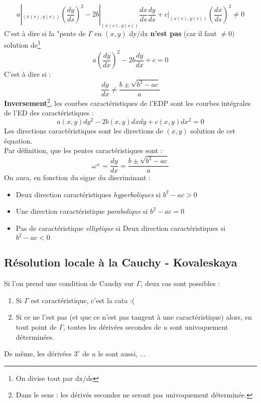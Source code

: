 \documentclass[british,french,11pt, a4paper, openany]{book}
\begin{document}
			\begin{equation}
				a|_{(x(s),y(s))} \left(\dfrac{dy}{ds}\right)^2 - 2b|_{(x(s),y(s))} \dfrac{dx}{ds}\dfrac{dy}{ds} + c|_{(x(s),y(s))}\left(\dfrac{dx}{ds}\right)^2 \neq 0
			\end{equation}
			C'est à dire si la "pente de $\Gamma$ en $(x,y)$ dy/dx \textbf{n'est pas} (car il faut $\neq 0)$ solution de\footnote{On divise tout par dx/ds}
			\begin{equation}
				a\left(\dfrac{dy}{dx}\right)^2 - 2b\dfrac{dy}{dx} + c = 0
			\end{equation}
			C'est à dire si :
			\begin{equation}
				\dfrac{dy}{dx} \neq \dfrac{b\pm \sqrt{b^2-ac}}{a}
			\end{equation}
			\textbf{Inversement}\footnote{Dans le sens : les dérivés secondes ne seront pas univoquement déterminée.}, les courbes caractéristiques de l'EDP sont les courbes intégrales de l'ED des caractéristiques :
			\begin{equation}
				a(x,y)dy^2 - 2b(x,y)dxdy + c(x,y)dx^2 = 0
			\end{equation}
			Les directions caractéristiques sont les directions de $(x,y)$ solution de cet équation.\\Par définition, que les pentes caractéristiques sont :
			\begin{equation}
				\omega^\pm = \dfrac{dy}{dx} = \dfrac{b\pm \sqrt{b^2-ac}}{a}
			\end{equation}
			On aura, en fonction du signe du discriminant :
			\begin{itemize}
				\item Deux direction caractéristiques \textit{hyperboliques} si $b^2-ac > 0$
				\item Une direction caractéristique \textit{parabolique} si $b^2-ac = 0$
				\item Pas de caractéristique \textit{elliptique} si Deux direction caractéristiques si $b^2-ac < 0$
			\end{itemize}
																
			\subsection{Résolution locale à la Cauchy - Kovaleskaya}
			Si l'on prend une condition de Cauchy sur $\Gamma$, deux cas sont possibles :
			\begin{enumerate}
				\item Si $\Gamma$ est caractéristique, c'est la cata :(
				\item Si ce ne l'est pas (et que ce n'est pas tangent à une caractéristique) alors, en tout point de $\Gamma$, toutes les dérivées secondes de $u$ sont univoquement déterminées.
			\end{enumerate}
			De même, les dérivées $3^e$ de $u$ le sont aussi, $\dots$\\
																
\end{document}
